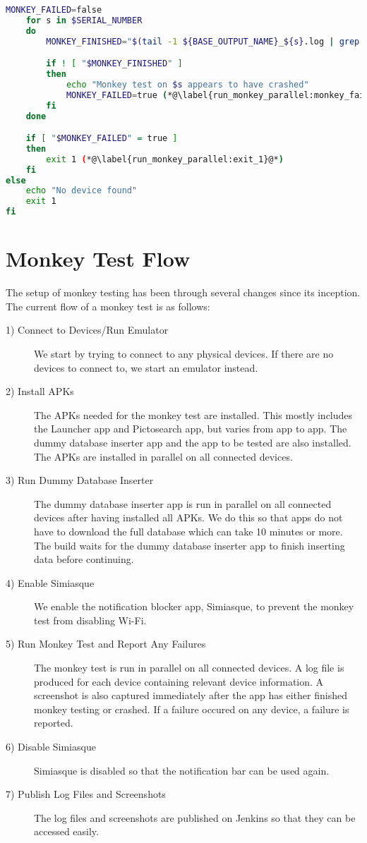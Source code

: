 \begin{lstlisting}[language=bash,caption=Script that runs monkey tests on all connected devices in parallel,label=lst:run_monkey_parallel]
    MONKEY_FAILED=false
    for s in $SERIAL_NUMBER
    do
        MONKEY_FINISHED="$(tail -1 ${BASE_OUTPUT_NAME}_${s}.log | grep -i "monkey finished")" (*@\label{run_monkey_parallel:check_output}@*)

        if ! [ "$MONKEY_FINISHED" ]
        then
            echo "Monkey test on $s appears to have crashed"
            MONKEY_FAILED=true (*@\label{run_monkey_parallel:monkey_failed}@*)
        fi
    done

    if [ "$MONKEY_FAILED" = true ]
    then
        exit 1 (*@\label{run_monkey_parallel:exit_1}@*)
    fi
else
    echo "No device found"
    exit 1
fi
\end{lstlisting}

\section{Monkey Test Flow}\label{sec:monkey_test_flow}
The setup of monkey testing has been through several changes since its inception. The current flow of a monkey test is as follows:

\begin{description}
  \item[1) Connect to Devices/Run Emulator] We start by trying to connect to any physical devices. If there are no devices to connect to, we start an emulator instead.
  \item[2) Install APKs] The APKs needed for the monkey test are installed. This mostly includes the Launcher app and Pictosearch app, but varies from app to app. The dummy database inserter app and the app to be tested are also installed. The APKs are installed in parallel on all connected devices.
  \item[3) Run Dummy Database Inserter] The dummy database inserter app is run in parallel on all connected devices after having installed all APKs. We do this so that apps do not have to download the full database which can take 10 minutes or more. The build waits for the dummy database inserter app to finish inserting data before continuing.
  \item[4) Enable Simiasque] We enable the notification blocker app, Simiasque, to prevent the monkey test from disabling Wi-Fi.
  \item[5) Run Monkey Test and Report Any Failures] The monkey test is run in parallel on all connected devices. A log file is produced for each device containing relevant device information. A screenshot is also captured immediately after the app has either finished monkey testing or crashed. If a failure occured on any device, a failure is reported.
  \item[6) Disable Simiasque] Simiasque is disabled so that the notification bar can be used again.
  \item[7) Publish Log Files and Screenshots] The log files and screenshots are published on Jenkins so that they can be accessed easily.
\end{description}